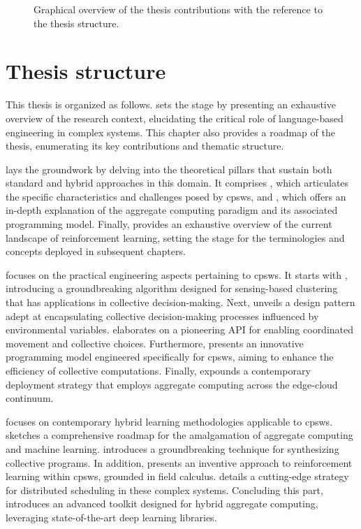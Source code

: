 \begin{refsection}
\begin{figure}
    \caption{Graphical overview of the thesis contributions with the reference to the thesis structure.}\label{fig:contributions}
\end{figure}
\section{Thesis structure}
This thesis is organized as follows.
 sets the stage by presenting an exhaustive overview of the research context, 
 elucidating the critical role of language-based engineering in complex systems. 
 This chapter also provides a roadmap of the thesis, enumerating its key contributions and thematic structure.

 lays the groundwork by delving into the theoretical pillars that sustain both standard and hybrid approaches in this domain. 
 It comprises , which articulates the specific characteristics and challenges posed by \acp{cpsw}, and , 
 which offers an in-depth explanation of the aggregate computing paradigm and its associated programming model.
 Finally,  provides an exhaustive overview of the current landscape of reinforcement learning, 
 setting the stage for the terminologies and concepts deployed in subsequent chapters. 

 focuses on the practical engineering aspects pertaining to \acp{cpsw}. 
 It starts with , introducing a groundbreaking algorithm designed for sensing-based clustering that has applications in collective decision-making. 
 Next,  unveils a design pattern adept at encapsulating collective decision-making processes influenced by environmental variables. 
  elaborates on a pioneering API for enabling coordinated movement and collective choices.
 Furthermore,  presents an innovative programming model engineered specifically for \acp{cpsw}, aiming to enhance the efficiency of collective computations. 
 Finally,  expounds a contemporary deployment strategy that employs aggregate computing across the edge-cloud continuum.

 focuses on contemporary hybrid learning methodologies applicable to \acp{cpsw}.  
  sketches a comprehensive roadmap for the amalgamation of aggregate computing and machine learning. 
  introduces a groundbreaking technique for synthesizing collective programs. 
 In addition,  presents an inventive approach to reinforcement learning within \acp{cpsw}, grounded in field calculus. 
  details a cutting-edge strategy for distributed scheduling in these complex systems. 
 Concluding this part,  introduces an advanced toolkit designed for hybrid aggregate computing, 
 leveraging state-of-the-art deep learning libraries.


\end{refsection}
